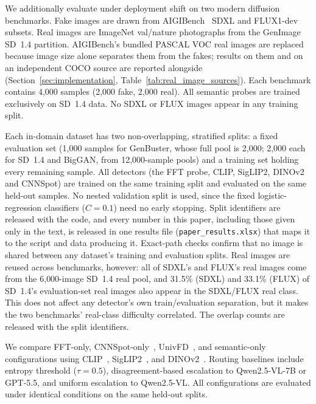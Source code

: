 \documentclass{ieeeaccess}
\begin{document}
We additionally evaluate under deployment shift on two modern diffusion benchmarks.
Fake images are drawn from AIGIBench~\cite{li2025artificial} SDXL and FLUX1-dev
subsets. Real images are ImageNet val/nature photographs from the GenImage SD~1.4
partition. AIGIBench's bundled PASCAL VOC real images are replaced because image size alone separates them from the fakes; results on them and on an independent COCO source are reported alongside (Section~\ref{sec:implementation}, Table~\ref{tab:real_image_sources}). Each benchmark contains
4{,}000 samples (2{,}000 fake, 2{,}000 real). All semantic probes are trained
exclusively on SD~1.4 data. No SDXL or FLUX images appear in any training split.

Each in-domain dataset has two non-overlapping, stratified splits: a fixed evaluation set (1{,}000 samples for GenBuster, whose full pool is 2{,}000; 2{,}000 each for SD~1.4 and BigGAN, from 12{,}000-sample pools) and a training set holding every remaining sample. All detectors (the FFT probe, CLIP, SigLIP2, DINOv2 and CNNSpot) are trained on the same training split and evaluated on the same held-out samples. No nested validation split is used, since the fixed logistic-regression classifiers ($C=0.1$) need no early stopping. Split identifiers are released with the code, and every number in this paper, including those given only in the text, is released in one results file (\texttt{paper\_results.xlsx}) that maps it to the script and data producing it. Exact-path checks confirm that no image is shared between any dataset's training and evaluation splits.
\label{sec:real_image_dedup}
Real images are reused across benchmarks, however: all of SDXL's and FLUX's real images come from the 6{,}000-image SD~1.4 real pool, and 31.5\% (SDXL) and 33.1\% (FLUX) of SD~1.4's evaluation-set real images also appear in the SDXL/FLUX real class. This does not affect any detector's own train/evaluation separation, but it makes the two benchmarks' real-class difficulty correlated. The overlap counts are released with the split identifiers.

We compare FFT-only, CNNSpot-only~\cite{wang2020cnn}, UnivFD~\cite{ojha2023fakedetect},
and semantic-only configurations using CLIP~\cite{pmlr-v139-radford21a},
SigLIP2~\cite{tschannen2025siglip2}, and DINOv2~\cite{oquab2023dinov2}. Routing
baselines include entropy threshold ($\tau = 0.5$), disagreement-based escalation to Qwen2.5-VL-7B or GPT-5.5, and uniform escalation to Qwen2.5-VL. All configurations
are evaluated under identical conditions on the same held-out splits.
\end{document}
